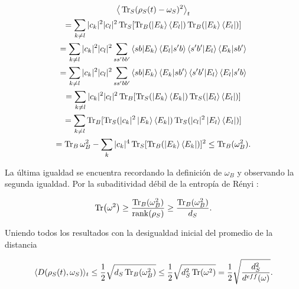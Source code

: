 \begin{multline}
\big \langle \Tr_{S}(\rho_{S}(t)-\omega_{S})^{2} \big \rangle_{t}\\
	= \sum_{k \neq l} |c_{k}|^{2} |c_{l}|^{2} \Tr_{S} [\Tr_{B}(\ket{E_{k}} \bra{E_{l}}) \Tr_{B}(\ket{E_{k}} \bra{E_{l}})]\\
	=\sum_{k \neq l} |c_{k}|^{2} |c_{l}|^{2} \sum_{ss' bb'} \bra{sb}\ket{E_{k}} \bra{E_{l}}\ket{s'b} \bra{s'b'}\ket{E_{l}} \bra{E_{k}}\ket{sb'}\\
	=\sum_{k \neq l} |c_{k}|^{2} |c_{l}|^{2} \sum_{ss' bb'} \bra{sb}\ket{E_{k}} \bra{E_{k}}\ket{sb'} \bra{s'b'}\ket{E_{l}} \bra{E_{l}}\ket{s'b}\\
	=\sum_{k \neq l} |c_{k}|^{2} |c_{l}|^{2} \Tr_{B} [\Tr_{S}(\ket{E_{k}} \bra{E_{k}}) \Tr_{S}(\ket{E_{l}} \bra{E_{l}})]\\
	=\sum_{k \neq l}  \Tr_{B} [\Tr_{S}(|c_{k}|^{2}\ket{E_{k}} \bra{E_{k}}) \Tr_{S}( |c_{l}|^{2} \ket{E_{l}} \bra{E_{l}})]\\
=\Tr_{B} \omega_{B}^{2} -\sum_{k} |c_{k}|^{4} \Tr_{S}[ \Tr_{B}( \ket{E_{k}} \bra{E_{k}})]^{2} \leq  \Tr_{B}( \omega_{B}^{2}).
\end{multline}

La última  igualdad se encuentra recordando la definición de $\omega_{B}$ y observando la segunda igualdad. Por la subaditividad débil de la entropía de Rényi \cite{RenyiEntropia}:

\begin{equation}
\Tr(\omega^{2}) \geq  \frac{\Tr_{B}(\omega_{B}^{2})}{ \rank (\rho_{S})} \geq \frac{\Tr_{B}(\omega_{B}^{2})}{d_{S}}.
\end{equation}

Uniendo todos los resultados con la desigualdad inicial del promedio de la distancia

\begin{equation}
\langle D(\rho_{S}(t) ,\omega_{S}) \rangle_{t} \le  \frac{1}{2} \sqrt{d_{S} \Tr_{B}(\omega_{B}^{2})} \le \frac{1}{2}\sqrt{d_{S}^{2} 	\Tr(\omega^{2})}=\frac{1}{2}\sqrt{\frac{d_{S}^{2}}{d^{eff}(\omega)}}.
\end{equation}

